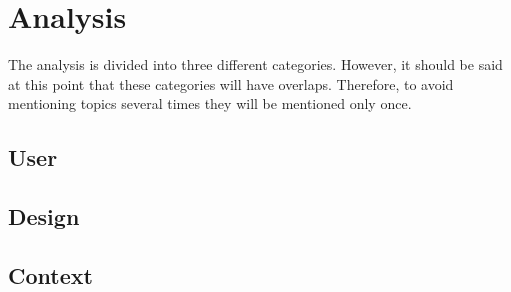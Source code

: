 \section{Analysis}\label{sec:analysis}
The analysis is divided into three different categories.
However, it should be said at this point that these categories will have overlaps.
Therefore, to avoid mentioning topics several times they will be mentioned only once.

\subsection{User}
\subsection{Design}
\subsection{Context}











